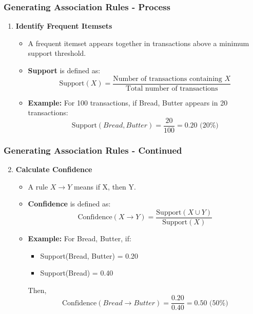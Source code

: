 \documentclass[aspectratio=169]{beamer}
\begin{document}
\begin{frame}[fragile]
    \frametitle{Generating Association Rules - Process}
    \begin{enumerate}
        \item \textbf{Identify Frequent Itemsets}
        \begin{itemize}
            \item A frequent itemset appears together in transactions above a minimum support threshold.
            \item \textbf{Support} is defined as:
            \begin{equation}
            \text{Support}(X) = \frac{\text{Number of transactions containing } X}{\text{Total number of transactions}}
            \end{equation}
            \item \textbf{Example:} For 100 transactions, if {Bread, Butter} appears in 20 transactions:
            \begin{equation}
            \text{Support}({Bread, Butter}) = \frac{20}{100} = 0.20 \text{ (20\%)}
            \end{equation}
        \end{itemize}
    \end{enumerate}
\end{frame}

\begin{frame}[fragile]
    \frametitle{Generating Association Rules - Continued}
    \begin{enumerate}
        \setcounter{enumi}{1}
        \item \textbf{Calculate Confidence}
        \begin{itemize}
            \item A rule \( X \rightarrow Y \) means if X, then Y.
            \item \textbf{Confidence} is defined as:
            \begin{equation}
            \text{Confidence}(X \rightarrow Y) = \frac{\text{Support}(X \cup Y)}{\text{Support}(X)}
            \end{equation}
            \item \textbf{Example:} For {Bread, Butter}, if:
            \begin{itemize}
                \item Support({Bread, Butter}) = 0.20
                \item Support({Bread}) = 0.40
            \end{itemize}
            Then,
            \begin{equation}
            \text{Confidence}(Bread \rightarrow Butter) = \frac{0.20}{0.40} = 0.50 \text{ (50\%)}
            \end{equation}
        \end{itemize}
    \end{enumerate}
\end{frame}
\end{document}
